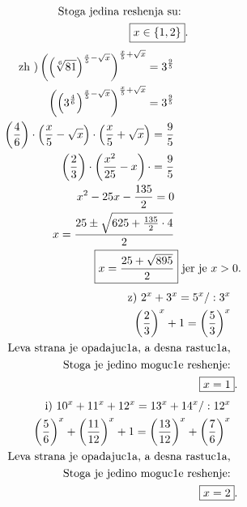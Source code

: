 \documentclass[11pt]{article}
\begin{document}
\begin{zad}
\begin{multicols}{2}
\begin{align*}
\text{Stoga jedina reshenja su:}\\
\Aboxed{x\in\{1,2\}}.
\end{align*}
\begin{align*}
\text{zh )} \left( \left(\sqrt[6]{81}\right)^{\frac{x}{5}-\sqrt{x}}\right)^{\frac{x}{5}+\sqrt{x}}=3^\frac{9}{5}\\
\left( \left(3^\frac{4}{6}\right)^{\frac{x}{5}-\sqrt{x}}\right)^{\frac{x}{5}+\sqrt{x}}=3^\frac{9}{5}\\
\left(\frac{4}{6}\right)\cdot\left(\frac{x}{5}-\sqrt{x}\right)\cdot\left(\frac{x}{5}+\sqrt{x}\right)=\frac{9}{5}\\
\left(\frac{2}{3}\right)\cdot\left(\frac{x^2}{25}-x\right)\cdot=\frac{9}{5}\\
x^2-25x-\frac{135}{2}=0\\
x=\frac{25\pm\sqrt{625+\frac{135}{2}\cdot4}}{2}\\
\Aboxed{x=\frac{25+\sqrt{895}}{2}}\text{ jer je }x>0.
\end{align*}
\begin{align*}
\text{z) } 2^x+3^x=5^x/:3^x\\
\left(\frac{2}{3}\right)^x+1=\left(\frac{5}{3}\right)^x\\
\text{Leva strana je opadajuc1a, a desna rastuc1a,}\\
\text{Stoga je jedino moguc1e reshenje:}\\
\Aboxed{x=1}.
\end{align*}
\begin{align*}
\text{i) } 10^x+11^x+12^x=13^x+14^x/:12^x\\
\left(\frac{5}{6}\right)^x+\left(\frac{11}{12}\right)^x+1=\left(\frac{13}{12}\right)^x+\left(\frac{7}{6}\right)^x\\
\text{Leva strana je opadajuc1a, a desna rastuc1a,}\\
\text{Stoga je jedino moguc1e reshenje:}\\
\Aboxed{x=2}.
\end{align*}
\end{multicols}
\end{zad}
\end{document}
